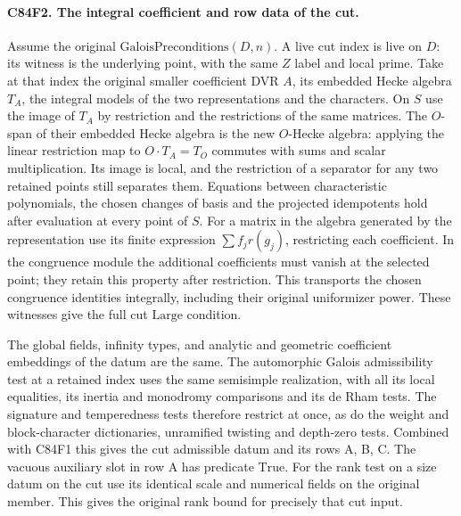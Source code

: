 \paragraph{C84F2. The integral coefficient and row data of the cut.}
Assume the original $\mathrm{GaloisPreconditions}(D,n)$.
A live cut index is live on $D$: its witness is the underlying
point, with the same $Z$ label and local prime. Take at that index
the original smaller coefficient DVR $A$, its embedded Hecke
algebra $T_A$, the integral models of the two representations and
the characters. On $S$ use the image of $T_A$ by restriction and
the restrictions of the same matrices. The $O$-span of their
embedded Hecke algebra is the new $O$-Hecke algebra: applying the
linear restriction map to $O\cdot T_A=T_O$ commutes with sums and
scalar multiplication. Its image is local, and the restriction
of a separator for any two retained points still separates them.
Equations between characteristic polynomials, the chosen changes
of basis and the projected idempotents hold after evaluation at
every point of $S$. For a matrix in the algebra generated by the
representation use its finite expression $\sum f_j r(g_j)$,
restricting each coefficient. In the congruence module the
additional coefficients must vanish at the selected point; they
retain this property after restriction. This transports the
chosen congruence identities integrally, including their original
uniformizer power. These witnesses give the full cut
$\mathrm{Large}$ condition.

The global fields, infinity types, and analytic and geometric
coefficient embeddings of the datum are the same. The
automorphic Galois admissibility test at a retained index uses
the same semisimple realization, with all its local equalities,
its inertia and monodromy comparisons and its de Rham tests.
The signature and temperedness tests therefore restrict at once,
as do the weight and block-character dictionaries, unramified
twisting and depth-zero tests. Combined with C84F1 this gives
the cut admissible datum and its rows A, B, C. The vacuous
auxiliary slot in row A has predicate $\mathrm{True}$. For the
rank test on a size datum on the cut use its identical scale
and numerical fields on the original member. This gives the
original rank bound for precisely that cut input.

